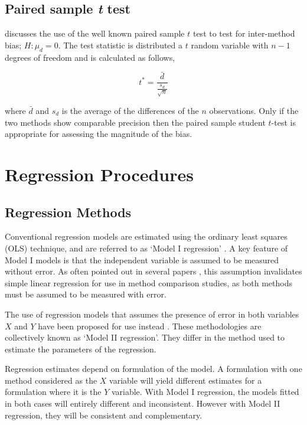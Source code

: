 \documentclass[12pt, a4paper]{report}
\theoremstyle{plain}
\theoremstyle{definition}
\theoremstyle{remark}
\begin{document}
\section{Paired sample \emph{t} test}

\citet{Bartko} discusses the use of the well known paired sample
$t$ test to test for inter-method bias; $H: \mu_{d}=0$. The test
statistic is distributed a $t$ random variable with $n-1$ degrees
of freedom and is calculated as follows,

\begin{equation}
t^{*} = \frac{\bar{d}}{ \frac{s_{d}}{\sqrt{n}}}
\end{equation}

where $\bar{d}$ and $s_{d}$ is the average of the differences of
the $n$ observations. Only if the two methods show comparable
precision then the paired sample student $t$-test is appropriate for
assessing the magnitude of the bias.




	\chapter{Regression Procedures}
	
	\section{Regression Methods}
	Conventional regression models are estimated using the ordinary
	least squares (OLS) technique, and are referred to as `Model I
	regression' \citep{CornCoch,ludbrook97}. A key feature of Model I
	models is that the independent variable is assumed to be measured
	without error. As often pointed out in several papers
	\citep{BA83,ludbrook97}, this assumption invalidates simple linear
	regression for use in method comparison studies, as both methods
	must be assumed to be measured with error.
	
	The use of regression models that assumes the presence of error in
	both variables $X$ and $Y$ have been proposed for use instead
	\citep{CornCoch,ludbrook97}. These methodologies are collectively
	known as `Model II regression'. They differ in the method used to
	estimate the parameters of the regression.
	
	Regression estimates depend on formulation of the model. A
	formulation with one method considered as the $X$ variable will
	yield different estimates for a formulation where it is the $Y$
	variable. With Model I regression, the models fitted in both cases
	will entirely different and inconsistent. However with Model II
	regression, they will be consistent and complementary.
	
\end{document}
